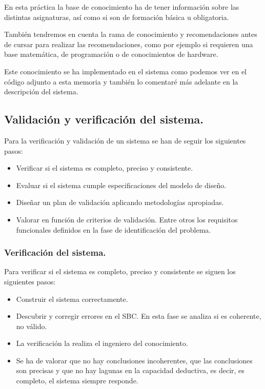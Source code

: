 \documentclass[12pt, spanish]{article}
\begin{document}
En esta práctica la base de conocimiento ha de tener información sobre las distintas asignaturas, así como si son de formación básica u obligatoria.

También tendremos en cuenta la rama de conocimiento y recomendaciones antes de cursar para realizar las recomendaciones, como por ejemplo si requieren una base matemática, de programación o de conocimientos de hardware.

Este conocimiento se ha implementado en el sistema como podemos ver en el código adjunto a esta memoria y también lo comentaré más adelante en la descripción del sistema.

\subsection{Validación y verificación del sistema.}

Para la verificación y validación de un sistema se han de seguir los siguientes pasos:

\begin{itemize}
	\item Verificar si el sistema es completo, preciso y consistente.
	\item Evaluar si el sistema cumple especificaciones del modelo de diseño.
	\item Diseñar un plan de validación aplicando metodologías apropiadas.
	\item Valorar en función de criterios de validación. Entre otros los requisitos funcionales definidos en la fase de identificación del problema.
\end{itemize}

\subsubsection{Verificación del sistema.}

Para verificar si el sistema es completo, preciso y consistente se siguen los siguientes pasos:

\begin{itemize}
	\item Construir el sistema correctamente.
	\item Descubrir y corregir errores en el SBC. En esta fase se analiza si es coherente, no válido.
	\item La verificación la realiza el ingeniero del conocimiento.
	\item Se ha de valorar que no hay conclusiones incoherentes, que las conclusiones son precisas y que no hay lagunas en la capacidad deductiva, es decir, es completo, el sistema siempre responde.
\end{itemize}
\end{document}
